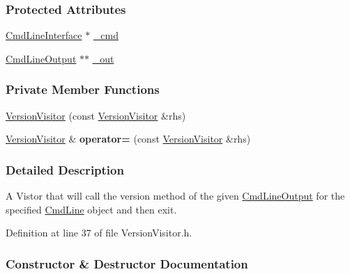 \subsubsection*{Protected Attributes}
\begin{DoxyCompactItemize}
\item 
\hyperlink{classTCLAP_1_1CmdLineInterface}{Cmd\+Line\+Interface} $\ast$ \hyperlink{classTCLAP_1_1VersionVisitor_ac789d900e73daa8b4b53a1e9b80b756e}{\+\_\+cmd}
\item 
\hyperlink{classTCLAP_1_1CmdLineOutput}{Cmd\+Line\+Output} $\ast$$\ast$ \hyperlink{classTCLAP_1_1VersionVisitor_ab4c9f44a2bd62830e42f79b35ac4d300}{\+\_\+out}
\end{DoxyCompactItemize}
\subsubsection*{Private Member Functions}
\begin{DoxyCompactItemize}
\item 
\hyperlink{classTCLAP_1_1VersionVisitor_ac1c61a253ad1b1edc0c896a6a1c54f9b}{Version\+Visitor} (const \hyperlink{classTCLAP_1_1VersionVisitor}{Version\+Visitor} \&rhs)
\item 
\hyperlink{classTCLAP_1_1VersionVisitor}{Version\+Visitor} \& {\bfseries operator=} (const \hyperlink{classTCLAP_1_1VersionVisitor}{Version\+Visitor} \&rhs)\hypertarget{classTCLAP_1_1VersionVisitor_a9f36920293e2e6c639e4abfeb9b3eea6}{}\label{classTCLAP_1_1VersionVisitor_a9f36920293e2e6c639e4abfeb9b3eea6}

\end{DoxyCompactItemize}


\subsubsection{Detailed Description}
A Vistor that will call the version method of the given \hyperlink{classTCLAP_1_1CmdLineOutput}{Cmd\+Line\+Output} for the specified \hyperlink{classTCLAP_1_1CmdLine}{Cmd\+Line} object and then exit. 

Definition at line 37 of file Version\+Visitor.\+h.



\subsubsection{Constructor \& Destructor Documentation}
